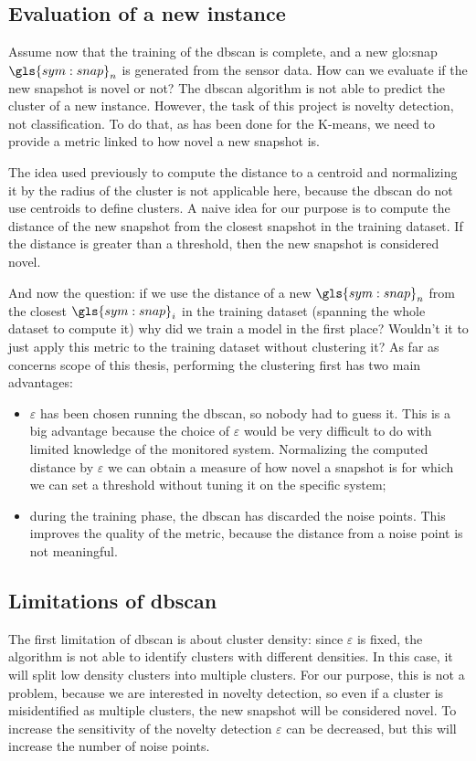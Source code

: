 \subsection{Evaluation of a new instance}
Assume now that the training of the \gls{dbscan} is complete, and a new \gls{glo:snap} $\gls{sym:snap}_n$ is generated from the sensor data. How can we evaluate if the new snapshot is novel or not?
The \gls{dbscan} algorithm is not able to predict the cluster of a new instance. However, the task of this project is novelty detection, not classification.
To do that, as has been done for the K-means, we need to provide a metric linked to how novel a new snapshot is. 

The idea used previously to compute the distance to a centroid and normalizing it by the radius of the cluster is not applicable here, because the \gls{dbscan} do not use centroids to define clusters. A naive idea for our purpose is to compute the distance of the new snapshot from the closest snapshot in the training dataset.
If the distance is greater than a threshold, then the new snapshot is considered novel.

And now the question: if we use the distance of a new $\gls{sym:snap}_n$ from the closest $\gls{sym:snap}_i$ in the training dataset (spanning the whole dataset to compute it) why did we train a model in the first place? Wouldn't it to just apply this metric to the training dataset without clustering it? As far as concerns scope of this thesis, performing the clustering first has two main advantages:
\begin{itemize}
    \item $\varepsilon$ has been chosen running the \gls{dbscan}, so nobody had to guess it. This is a big advantage because the choice of $\varepsilon$ would be very difficult to do with limited knowledge of the monitored system. Normalizing the computed distance by $\varepsilon$ we can obtain a measure of how novel a snapshot is for which we can set a threshold without tuning it on the specific system;
    \item during the training phase, the \gls{dbscan} has discarded the noise points. This improves the quality of the metric, because the distance from a noise point is not meaningful.
\end{itemize}

\subsection{Limitations of \gls{dbscan}}
The first limitation of \gls{dbscan} is about cluster density: since $\varepsilon$ is fixed, the algorithm is not able to identify clusters with different densities. In this case, it will split low density clusters into multiple clusters. For our purpose, this is not a problem, because we are interested in novelty detection, so even if a cluster is misidentified as multiple clusters, the new snapshot will be considered novel. To increase the sensitivity of the novelty detection $\varepsilon$ can be decreased, but this will increase the number of noise points.

